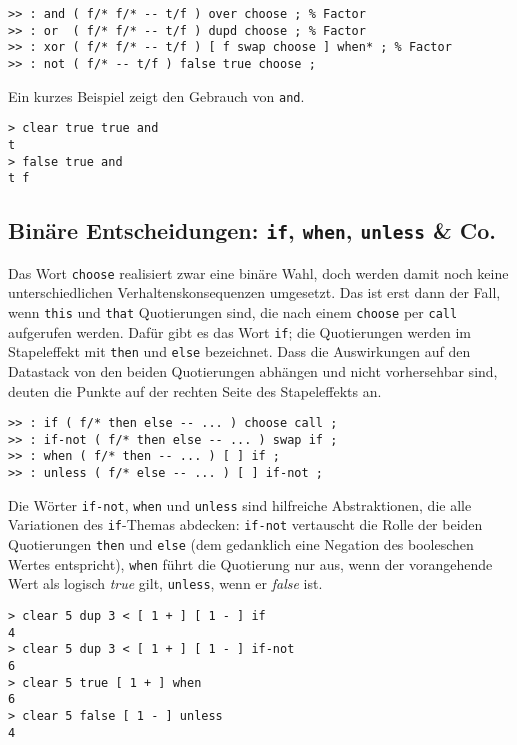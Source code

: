 \begin{verbatim}
>> : and ( f/* f/* -- t/f ) over choose ; % Factor
>> : or  ( f/* f/* -- t/f ) dupd choose ; % Factor
>> : xor ( f/* f/* -- t/f ) [ f swap choose ] when* ; % Factor
>> : not ( f/* -- t/f ) false true choose ;
\end{verbatim}

Ein kurzes Beispiel zeigt den Gebrauch von \verb|and|.

\begin{verbatim}
> clear true true and
t
> false true and
t f
\end{verbatim}
  
\subsection{Binäre Entscheidungen: \texttt{if}, \texttt{when}, \texttt{unless} \& Co.}

Das Wort \verb|choose| realisiert zwar eine binäre Wahl, doch werden damit noch keine unterschiedlichen Verhaltenskonsequenzen umgesetzt. Das ist erst dann der Fall, wenn \verb|this| und \verb|that| Quotierungen sind, die nach einem \verb|choose| per \verb|call| aufgerufen werden. Dafür gibt es das Wort \verb|if|; die Quotierungen werden im Stapeleffekt mit \verb|then| und \verb|else| bezeichnet. Dass die Auswirkungen auf den Datastack von den beiden Quotierungen abhängen und nicht vorhersehbar sind, deuten die Punkte auf der rechten Seite des Stapeleffekts an.

\begin{verbatim}
>> : if ( f/* then else -- ... ) choose call ;
>> : if-not ( f/* then else -- ... ) swap if ;
>> : when ( f/* then -- ... ) [ ] if ;
>> : unless ( f/* else -- ... ) [ ] if-not ;
\end{verbatim}

Die Wörter \verb|if-not|, \verb|when| und \verb|unless| sind hilfreiche Abstraktionen, die alle Variationen des \verb|if|-Themas abdecken: \verb|if-not| vertauscht die Rolle der beiden Quotierungen \verb|then| und \verb|else| (dem gedanklich eine Negation des booleschen Wertes entspricht), \verb|when| führt die Quotierung nur aus, wenn der vorangehende Wert als logisch \emph{true} gilt, \verb|unless|, wenn er \emph{false} ist.

\begin{verbatim}
> clear 5 dup 3 < [ 1 + ] [ 1 - ] if
4
> clear 5 dup 3 < [ 1 + ] [ 1 - ] if-not
6
> clear 5 true [ 1 + ] when
6
> clear 5 false [ 1 - ] unless
4
\end{verbatim}

